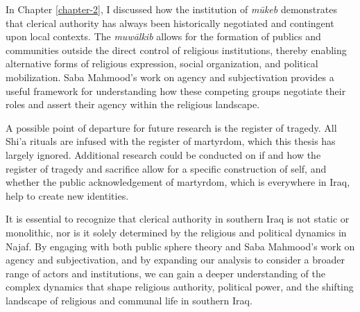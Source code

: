In Chapter \ref{chapter-2}, I discussed how the institution of \emph{mūkeb} demonstrates that clerical authority has always been historically negotiated and contingent upon local contexts. The \emph{muwālkib} allows for the formation of publics and communities outside the direct control of religious institutions, thereby enabling alternative forms of religious expression, social organization, and political mobilization. Saba Mahmood's work on agency and subjectivation provides a useful framework for understanding how these competing groups negotiate their roles and assert their agency within the religious landscape.

A possible point of departure for future research is the register of tragedy. All Shi'a rituals are infused with the register of martyrdom, which this thesis has largely ignored. Additional research could be conducted on if and how the register of tragedy and sacrifice allow for a specific construction of self, and whether the public acknowledgement of martyrdom, which is everywhere in Iraq, help to create new identities. 

It is essential to recognize that clerical authority in southern Iraq is not static or monolithic, nor is it solely determined by the religious and political dynamics in Najaf. By engaging with both public sphere theory and Saba Mahmood's work on agency and subjectivation, and by expanding our analysis to consider a broader range of actors and institutions, we can gain a deeper understanding of the complex dynamics that shape religious authority, political power, and the shifting landscape of religious and communal life in southern Iraq.